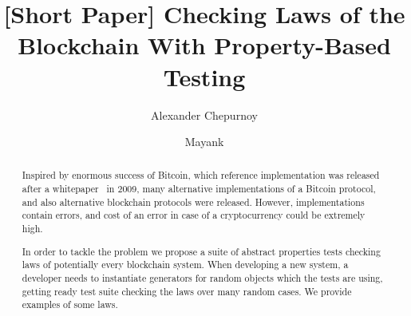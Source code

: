 \documentclass[]{llncs}   %
\begin{document}
\title{[Short Paper] Checking Laws of the Blockchain With Property-Based Testing}

\author{Alexander Chepurnoy \and Mayank}
\maketitle

\begin{abstract}
Inspired by enormous success of Bitcoin, which reference implementation was released after a whitepaper~\cite{Nakamoto2008} in 2009, many alternative implementations of a Bitcoin protocol, and also alternative blockchain protocols were released. However, implementations contain errors, and cost of an error in case of a cryptocurrency could be extremely high. 

In order to tackle the problem we propose a suite of abstract properties tests checking laws of potentially every blockchain system. 
When developing a new system, a developer needs to instantiate generators for random objects which the tests are using, getting ready test suite checking the laws over many random cases. We provide examples of some laws.
\end{abstract}











\end{document}
